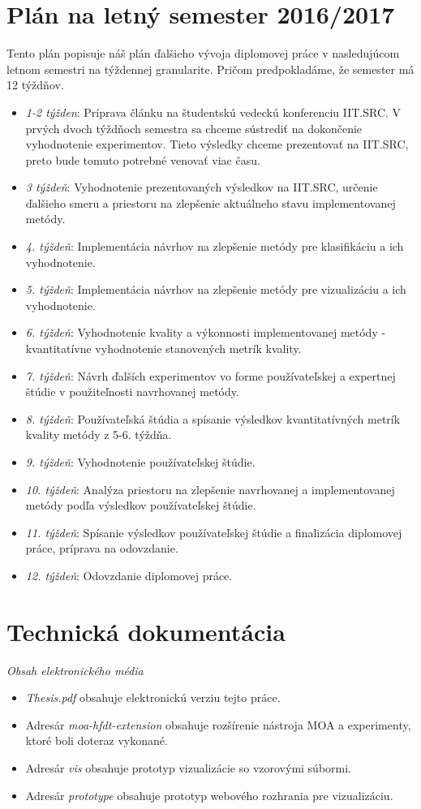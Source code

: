 \section{Plán na letný semester 2016/2017}\label{plan-leto}
Tento plán popisuje náš plán ďalšieho vývoja diplomovej práce v nasledujúcom letnom semestri na týždennej granularite. Pričom predpokladáme, že semester má 12 týždňov.
\begin{itemize}
	\item \textit{1-2 týžden}: Príprava článku na študentskú vedeckú konferenciu IIT.SRC. V prvých dvoch týždňoch semestra sa chceme sústrediť na dokončenie vyhodnotenie experimentov. Tieto výsledky chceme prezentovať na IIT.SRC, preto bude tomuto potrebné venovať viac času.
	\item \textit{3 týždeň}: Vyhodnotenie prezentovaných výsledkov na IIT.SRC, určenie ďalšieho smeru a priestoru na zlepšenie aktuálneho stavu implementovanej metódy.
	\item \textit{4. týždeň}: Implementácia návrhov na zlepšenie metódy pre klasifikáciu a ich vyhodnotenie.
	\item \textit{5. týždeň}: Implementácia návrhov na zlepšenie metódy pre vizualizáciu a ich vyhodnotenie. 
	\item \textit{6. týždeň}: Vyhodnotenie kvality a výkonnosti implementovanej metódy - kvantitatívne vyhodnotenie stanovených metrík kvality.
	\item \textit{7. týždeň}: Návrh ďalších experimentov vo forme používateľskej a expertnej štúdie v použiteľnosti navrhovanej metódy.
	\item \textit{8. týždeň}: Používateľská štúdia a spísanie výsledkov kvantitatívných metrík kvality metódy z 5-6. týždňa.
	\item \textit{9. týždeň}: Vyhodnotenie používateľskej štúdie.
	\item \textit{10. týždeň}: Analýza priestoru na zlepšenie navrhovanej a implementovanej metódy podľa výsledkov používateľskej štúdie.
	\item \textit{11. týždeň}: Spísanie výsledkov používateľskej štúdie a finalizácia diplomovej práce, príprava na odovzdanie.
	\item \textit{12. týždeň}: Odovzdanie diplomovej práce.
\end{itemize} 

\section{Technická dokumentácia}\label{tech-doku}
\textit{Obsah elektronického média}
\begin{itemize}
	\item \textit{Thesis.pdf} obsahuje elektronickú verziu tejto práce.
	\item Adresár \textit{moa-hfdt-extension} obsahuje rozšírenie nástroja MOA a experimenty, ktoré boli doteraz vykonané.
	\item Adresár \textit{vis} obsahuje prototyp vizualizácie so vzorovými súbormi.
	\item Adresár \textit{prototype} obsahuje prototyp webového rozhrania pre vizualizáciu.
\end{itemize}


